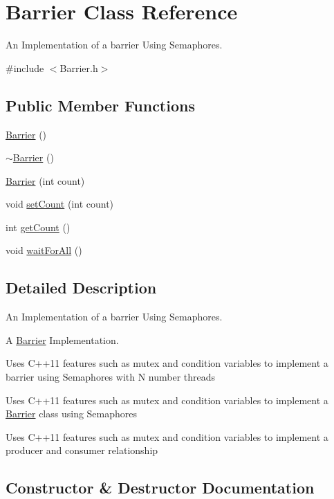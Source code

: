 \hypertarget{class_barrier}{}\section{Barrier Class Reference}
\label{class_barrier}


An Implementation of a barrier Using Semaphores.  




{\ttfamily \#include $<$Barrier.\+h$>$}

\subsection*{Public Member Functions}
\begin{DoxyCompactItemize}
\item 
\hyperlink{class_barrier_a462a2435e07b6fabc0265011f03310ee}{Barrier} ()
\item 
\hyperlink{class_barrier_a401f40e73302009b305904ffc7825304}{$\sim$\+Barrier} ()
\item 
\hyperlink{class_barrier_a68730c862911d37696957056595aa604}{Barrier} (int count)
\item 
void \hyperlink{class_barrier_ab999e172844330d8b9a1c13f3766959d}{set\+Count} (int count)
\item 
int \hyperlink{class_barrier_a471bfe5ce54384baa7dbd195ae3a7b30}{get\+Count} ()
\item 
void \hyperlink{class_barrier_a59b259f25f6acdc5f943398035d2d87a}{wait\+For\+All} ()
\end{DoxyCompactItemize}


\subsection{Detailed Description}
An Implementation of a barrier Using Semaphores. 

A \hyperlink{class_barrier}{Barrier} Implementation.

Uses C++11 features such as mutex and condition variables to implement a barrier using Semaphores with N number threads

Uses C++11 features such as mutex and condition variables to implement a \hyperlink{class_barrier}{Barrier} class using Semaphores

Uses C++11 features such as mutex and condition variables to implement a producer and consumer relationship 

\subsection{Constructor \& Destructor Documentation}

